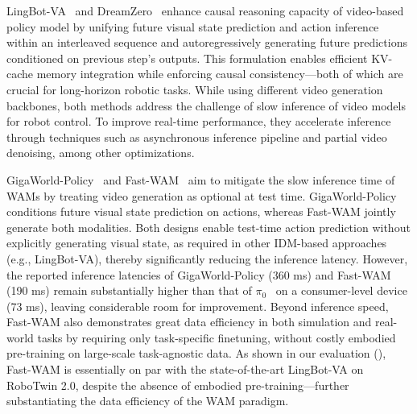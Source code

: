 \documentclass{article}
\begin{document}
LingBot-VA~\citep{li2026causal} and DreamZero~\citep{ye2026dreamzero} enhance causal reasoning capacity of video-based policy model by unifying future visual state prediction and action inference within an interleaved sequence and autoregressively generating future predictions conditioned on previous step's outputs. This formulation enables efficient KV-cache memory integration while enforcing causal consistency---both of which are crucial for long-horizon robotic tasks. While using different video generation backbones, both methods address the challenge of slow inference of video models for robot control. To improve real-time performance, they accelerate inference through techniques such as asynchronous inference pipeline and partial video denoising, among other optimizations. 

GigaWorld-Policy~\citep{ye2026gigaworld} and Fast-WAM~\citep{yuan2026fast} aim to mitigate the slow inference time of WAMs by treating video generation as optional at test time. GigaWorld-Policy conditions future visual state prediction on actions, whereas Fast-WAM jointly generate both modalities. Both designs enable test-time action prediction without explicitly generating visual state, as required in other IDM-based approaches (e.g., LingBot-VA), thereby significantly reducing the inference latency. However, the reported inference latencies of GigaWorld-Policy (360 ms) and Fast-WAM (190 ms) remain substantially higher than that of $\pi_0$~\citep{black2025pi0} on a consumer-level device (73 ms), leaving considerable room for improvement. Beyond inference speed, Fast-WAM also demonstrates great data efficiency in both simulation and real-world tasks by requiring only task-specific finetuning, without costly embodied pre-training on large-scale task-agnostic data. As shown in our evaluation (), Fast-WAM is essentially on par with the state-of-the-art LingBot-VA on RoboTwin 2.0, despite the absence of embodied pre-training---further substantiating the data efficiency of the WAM paradigm.
\end{document}
